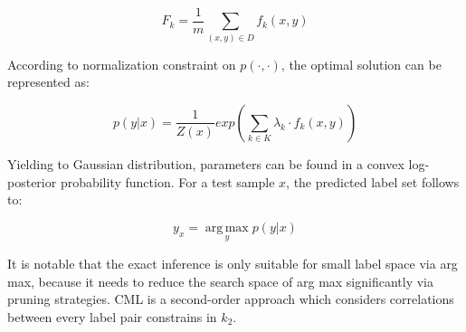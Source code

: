 \begin{equation}\label{eq:CMLExpect}
F_{k} = \frac{1}{m}\sum_{(x,y) \in D}f_{k}(x,y)
\end{equation}

According to normalization constraint on $p(\cdot,\cdot)$, the optimal solution can be represented as:

\begin{equation}\label{eq:CMLOptimal}
p(y|x) = \frac{1}{Z(x)}exp(\sum_{k \in K}\lambda_{k} \cdot f_{k}(x,y))
\end{equation}

Yielding to Gaussian distribution, parameters can be found in a convex log-posterior probability function. For a test sample $x$, the predicted label set follows to:

\begin{equation}\label{eq:CMLLabel}
y_{x} = \operatorname*{arg\,max}_{y} p(y|x)
\end{equation}

It is notable that the exact inference is only suitable for small label space via arg max, because it needs to reduce the search space of arg max significantly via pruning strategies. CML is a second-order approach which considers correlations between every label pair constrains in $k_{2}$. 